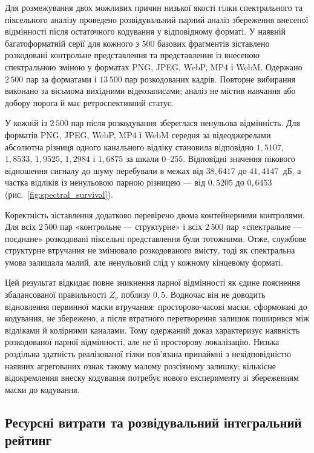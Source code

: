 Для розмежування двох можливих причин низької якості гілки спектрального та піксельного аналізу проведено розвідувальний парний аналіз збереження внесеної відмінності після остаточного кодування у відповідному форматі. У наявній багатоформатній серії для кожного з $500$ базових фрагментів зіставлено розкодовані контрольне представлення та представлення із внесеною спектральною зміною у форматах PNG, JPEG, WebP, MP4 і WebM. Одержано $2\,500$ пар за форматами і $13\,500$ пар розкодованих кадрів. Повторне вибирання виконано за вісьмома вихідними відеозаписами; аналіз не містив навчання або добору порога й має ретроспективний статус.

У кожній із $2\,500$ пар після розкодування збереглася ненульова відмінність. Для форматів PNG, JPEG, WebP, MP4 і WebM середня за відеоджерелами абсолютна різниця одного канального відліку становила відповідно $1{,}5107$, $1{,}8533$, $1{,}9525$, $1{,}2984$ і $1{,}6875$ за шкали $0$--$255$. Відповідні значення пікового відношення сигналу до шуму перебували в межах від $38{,}6417$ до $41{,}4147$~дБ, а частка відліків із ненульовою парною різницею --- від $0{,}5205$ до $0{,}6453$ (рис.~\ref{fig:spectral_survival}).



Коректність зіставлення додатково перевірено двома контейнерними контролями. Для всіх $2\,500$ пар «контрольне --- структурне» і всіх $2\,500$ пар «спектральне --- поєднане» розкодовані піксельні представлення були тотожними. Отже, службове структурне втручання не змінювало розкодованого вмісту, тоді як спектральна умова залишала малий, але ненульовий слід у кожному кінцевому форматі.

Цей результат відкидає повне зникнення парної відмінності як єдине пояснення збалансованої правильності $Z_v$ поблизу $0{,}5$. Водночас він не доводить відновлення первинної маски втручання: просторово-часові маски, сформовані до кодування, не збережено, а після втратного перетворення залишок поширився між відліками й колірними каналами. Тому одержаний доказ характеризує наявність розкодованої парної відмінності, але не її просторову локалізацію. Низька роздільна здатність реалізованої гілки пов’язана принаймні з невідповідністю наявних агрегованих ознак такому малому розсіяному залишку; кількісне відокремлення внеску кодування потребує нового експерименту зі збереженням маски до кодування.

\subsection{Ресурсні витрати та розвідувальний інтегральний рейтинг}

